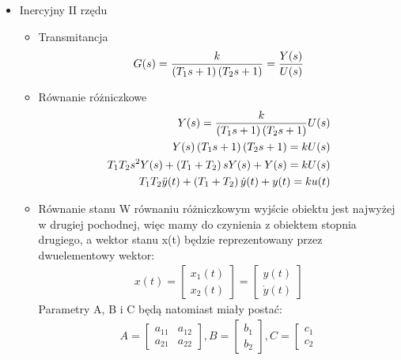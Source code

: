 \documentclass[a4paper,10pt]{article}
\begin{document}
\begin{itemize}
\item Inercyjny II rzędu
\begin{itemize}
\item Transmitancja
	\begin{eqnarray}
		G(s)= {k \over \left({T_{1}s + 1}\right) \left({T_{2}s + 1}\right)} = {Y(s) \over U(s)}
	\end{eqnarray}
\item Równanie różniczkowe
	\begin{eqnarray}
		\nonumber Y(s) = {k \over {\left({T_{1}s + 1}\right) \left({T_{2}s + 1}\right)}} U(s)\\
		\nonumber Y(s)\left({T_{1}s + 1}\right) \left({T_{2}s + 1}\right)= kU(s)\\
		\nonumber T_{1}T_{2}s^{2}Y(s) + \left({T_{1} + T_{2}}\right) s Y(s) + Y(s)= kU(s)\\
		T_{1}T_{2}\ddot{y}(t) + \left({T_{1} + T_{2}}\right) \dot{y}(t) + y(t)= ku(t) \label{eq:inerc_rozn}
	\end{eqnarray}
\item Równanie stanu
\newline W równaniu różniczkowym wyjście obiektu jest najwyżej w drugiej pochodnej, więc mamy do czynienia z obiektem stopnia drugiego, a wektor stanu x(t) będzie reprezentowany przez dwuelementowy wektor:
 	\begin{eqnarray}
		\nonumber x(t) = \left[ 
			\begin{array}{l}
				x_{1}(t)\\
				x_{2}(t)
			\end{array}
		\right] = \left[ 
			\begin{array}{l}
				y(t)\\
				\dot{y}(t)
			\end{array}
		\right]
	\end{eqnarray}
Parametry A, B i C będą natomiast miały postać:
	\begin{eqnarray}
		\nonumber A = \left[ 
			\begin{array}{ll}
				a_{11} & a_{12}\\
				a_{21} & a_{22}
			\end{array}
		\right], B = \left[ 
			\begin{array}{l}
				b_{1}\\
				b_{2}
			\end{array}
		\right], C = \left[ 
			\begin{array}{l}
				c_{1}\\
				c_{2}
			\end{array}

\end{eqnarray}
\end{itemize}
\end{itemize}
\end{document}
